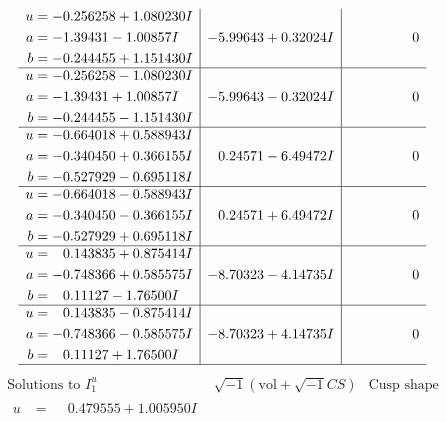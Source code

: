 \documentclass[1p]{elsarticle_modified}
\theoremstyle{definition}
\newcommand{\I}{\sqrt{-1}}
\begin{document}
$$\begin{array}{c|c|c}
\begin{aligned}
u &= -0.256258 + 1.080230 I \\
a &= -1.39431 - 1.00857 I \\
b &= -0.244455 + 1.151430 I\end{aligned}
 & -5.99643 + 0.32024 I & \phantom{-0.000000 } 0 \\ \hline\begin{aligned}
u &= -0.256258 - 1.080230 I \\
a &= -1.39431 + 1.00857 I \\
b &= -0.244455 - 1.151430 I\end{aligned}
 & -5.99643 - 0.32024 I & \phantom{-0.000000 } 0 \\ \hline\begin{aligned}
u &= -0.664018 + 0.588943 I \\
a &= -0.340450 + 0.366155 I \\
b &= -0.527929 - 0.695118 I\end{aligned}
 & \phantom{-}0.24571 - 6.49472 I & \phantom{-0.000000 } 0 \\ \hline\begin{aligned}
u &= -0.664018 - 0.588943 I \\
a &= -0.340450 - 0.366155 I \\
b &= -0.527929 + 0.695118 I\end{aligned}
 & \phantom{-}0.24571 + 6.49472 I & \phantom{-0.000000 } 0 \\ \hline\begin{aligned}
u &= \phantom{-}0.143835 + 0.875414 I \\
a &= -0.748366 + 0.585575 I \\
b &= \phantom{-}0.11127 - 1.76500 I\end{aligned}
 & -8.70323 - 4.14735 I & \phantom{-0.000000 } 0 \\ \hline\begin{aligned}
u &= \phantom{-}0.143835 - 0.875414 I \\
a &= -0.748366 - 0.585575 I \\
b &= \phantom{-}0.11127 + 1.76500 I\end{aligned}
 & -8.70323 + 4.14735 I & \phantom{-0.000000 } 0\\
 \hline 
 \end{array}$$\newpage$$\begin{array}{c|c|c}  
\text{Solutions to }I^u_{1}& \I (\text{vol} + \sqrt{-1}CS) & \text{Cusp shape}\\
 \hline 
\begin{aligned}
u &= \phantom{-}0.479555 + 1.005950 I \\

\end{aligned}
\end{array}$$
\end{document}
